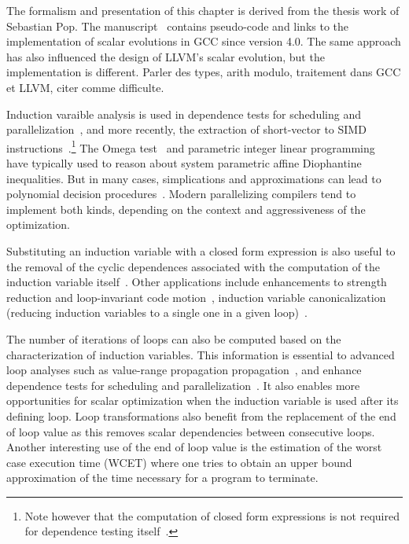 {The formalism and presentation of this chapter is derived from the thesis work of Sebastian Pop. 
The manuscript~\cite{TPop} contains pseudo-code and links to the implementation of scalar evolutions in GCC since version 4.0. 
The same approach has also influenced the design of LLVM's scalar evolution, but the implementation is different. 
Parler des types, arith modulo, traitement dans GCC et LLVM, citer comme difficulte.

Induction varaible analysis is used in dependence tests for scheduling and parallelization~\cite{Wol96}, and more recently, the extraction of short-vector to SIMD instructions~\cite{Nuz06}.\footnote{Note however that the computation of closed form expressions is not required for dependence testing itself~\cite{Wu01}.} 
The Omega test~\cite{Pug91} and parametric integer linear programming~\cite{Fea88b} have typically used to reason about system parametric affine Diophantine inequalities. 
But in many cases, simplications and approximations can lead to polynomial decision procedures~\cite{Ban88}. 
Modern parallelizing compilers tend to implement both kinds, depending on the context and aggressiveness of the optimization.

Substituting an induction variable with a closed form expression is also useful to the removal of the cyclic dependences associated with the computation of the induction variable itself~\cite{Ger95}. 
Other applications include enhancements to strength reduction and loop-invariant code motion~\cite{Ger95}, induction variable canonicalization (reducing induction variables to a single one in a given loop)~\cite{Liu96}.

The number of iterations of loops can also be computed based on the characterization of induction variables. 
This information is essential to advanced loop analyses such as value-range propagation propagation~\cite{VRP}, and enhance dependence tests for scheduling and parallelization~\cite{Ban88,Pug91}. 
It also enables more opportunities for scalar optimization when the induction variable is used after its defining loop. 
Loop transformations also benefit from the replacement of the end of loop value as this removes scalar dependencies between consecutive loops. 
Another interesting use of the end of loop value is the estimation of the worst case execution time (WCET) where one tries to obtain an upper bound approximation of the time necessary for a program to terminate.


}
